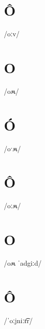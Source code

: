 \documentclass[10pt,a4paper,twoside]{book}
\begin{document}
\section*{Ô}

\begin{multicols}{3}
 {/oːv/} {}
\end{multicols}

\section*{O}

\begin{multicols}{3}
 {/oʍ/} {}
\end{multicols}

\section*{Ó}

\begin{multicols}{3}
 {/oˑʍ/} {}
\end{multicols}

\section*{Ô}

\begin{multicols}{3}
 {/oːʍ/} {}
\end{multicols}

\section*{O}

\begin{multicols}{3}
 {/oʍ ˈadgiːd/} {}
\end{multicols}

\section*{Ô}

\begin{multicols}{3}
 {/ˈoːjniːr͡r/} {}
\end{multicols}
\end{document}
